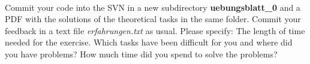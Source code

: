 \\

Commit your code into the SVN in a new subdirectory 
\textbf{uebungsblatt\_0\ExerciseSheetNumber} and a PDF with the solutions of the 
theoretical tasks in the same folder. Commit your feedback in a text file 
\emph{erfahrungen.txt} as usual. Please specify: The length of time needed for 
the exercise. Which tasks have been difficult for you and where did you have 
problems? How much time did you spend to solve the problems?
